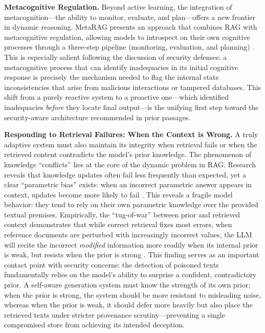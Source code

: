 \documentclass[11pt]{article}
\begin{document}
\textbf{Metacognitive Regulation.} Beyond active learning, the integration of metacognition---the ability to monitor, evaluate, and plan---offers a new frontier in dynamic reasoning. MetaRAG presents an approach that combines RAG with metacognitive regulation, allowing models to introspect on their own cognitive processes through a three-step pipeline (monitoring, evaluation, and planning) \cite{ref44}. This is especially salient following the discussion of security defenses: a metacognitive process that can identify inadequacies in its initial cognitive response is precisely the mechanism needed to flag the internal state inconsistencies that arise from malicious interactions or tampered databases. This shift from a purely reactive system to a proactive one---which identified inadequacies \emph{before} they locate final output---is the unifying first step toward the security-aware architecture recommended in prior passages.

\textbf{Responding to Retrieval Failures: When the Context is Wrong.} A truly adaptive system must also maintain its integrity when retrieval fails or when the retrieved content contradicts the model's prior knowledge. The phenomenon of knowledge ``conflicts'' lies at the core of the dynamic problem in RAG. Research reveals that knowledge updates often fail less frequently than expected, yet a clear ``parametric bias'' exists: when an incorrect parametric answer appears in context, updates become more likely to fail \cite{ref9}. This reveals a fragile model behavior: they tend to rely on their own parametric knowledge over the provided textual premises. Empirically, the ``tug-of-war'' between prior and retrieved context demonstrates that while correct retrieval fixes most errors, when reference documents are perturbed with increasingly incorrect values, the LLM will recite the incorrect \emph{modified} information more readily when its internal prior is weak, but resists when the prior is strong \cite{ref238}. This finding serves as an important contact point with security concerns: the detection of poisoned texts fundamentally relies on the model's ability to surprise a confident, contradictory prior. A self-aware generation system must know the strength of its own prior; when the prior is strong, the system should be more resistant to misleading noise, whereas when the prior is weak, it should defer more heavily but also place the retrieved texts under stricter provenance scrutiny---preventing a single compromised store from achieving its intended deception.
\end{document}
